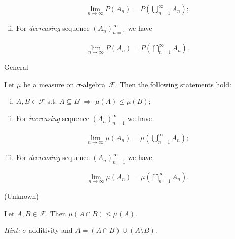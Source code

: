 \documentclass[10pt,landscape]{article}
\renewcommand{\leq}{\leqslant}
\newcommand{\Hint}{\textit{Hint: }}
\newcommand{\SigmaAlgebra}{$\sigma$-algebra}
\newcommand{\CalF}{\mathcal{F}}
\begin{document}
\begin{multicols}{3}
\begin{proposition}{1.2}{}
\begin{enumerate}[(i)]
                \begin{align*}
                    \lim_{n \to \infty} P(A_n) = P\left(\bigcup_{n=1}^{\infty} A_n \right);
                \end{align*}
            \item For \emph{decreasing} sequence $(A_n)_{n=1}^{\infty}$ we have

                \begin{align*}
                    \lim_{n \to \infty} P(A_n) = P\left(\bigcap_{n=1}^{\infty} A_n \right).
                \end{align*}
        \end{enumerate}

\end{proposition}

\begin{proposition}{1.2}{General}

    Let $\mu$ be a measure on \SigmaAlgebra\ $\CalF$. Then the following statements hold:

        \begin{enumerate}[(i)]
            \item $A, B \in \CalF$ s.t. $A \subseteq B$ $\Rightarrow$ $\mu(A) \leq \mu(B)$;
            \item For \emph{increasing} sequence $(A_n)_{n=1}^{\infty}$ we have

                \begin{align*}
                    \lim_{n \to \infty} \mu(A_n) = \mu\left(\bigcup_{n=1}^{\infty} A_n \right);
                \end{align*}
            \item For \emph{decreasing} sequence $(A_n)_{n=1}^{\infty}$ we have

                \begin{align*}
                    \lim_{n \to \infty} \mu(A_n) = \mu\left(\bigcap_{n=1}^{\infty} A_n \right).
                \end{align*}
        \end{enumerate}

\end{proposition}

\begin{proposition}{(Unknown)}{}

    Let $A, B \in \CalF$. Then $\mu(A \cap B) \leq \mu(A)$.

    \Hint $\sigma$-additivity and $A = (A \cap B) \cup (A \setminus B)$.


\end{proposition}
\end{multicols}
\end{document}
